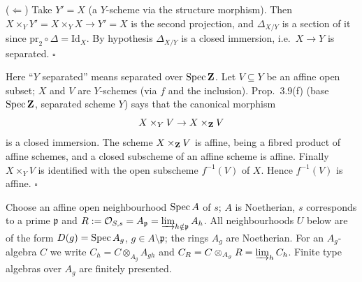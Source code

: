 \documentclass[11pt]{article}
\begin{document}
($\Leftarrow$) Take $Y'=X$ (a $Y$-scheme via the structure morphism). Then $X\times_YY'=X\times_YX\to Y'=X$ is the second projection, and $\Delta_{X/Y}$ is a section of it since $\mathrm{pr}_2\circ\Delta=\mathrm{Id}_X$. By hypothesis $\Delta_{X/Y}$ is a closed immersion, i.e.\ $X\to Y$ is separated. \hfill$\square$

\pf
Here ``$Y$ separated'' means separated over $\operatorname{Spec}\mathbf Z$. Let $V\subseteq Y$ be an affine open subset; $X$ and $V$ are $Y$-schemes (via $f$ and the inclusion). Prop.~3.9(f) (base $\operatorname{Spec}\mathbf Z$, separated scheme $Y$) says that the canonical morphism
\[ X\times_YV\to X\times_{\mathbf Z}V \]
is a closed immersion. The scheme $X\times_{\mathbf Z}V$ is affine, being a fibred product of affine schemes, and a closed subscheme of an affine scheme is affine. Finally $X\times_YV$ is identified with the open subscheme $f^{-1}(V)$ of $X$. Hence $f^{-1}(V)$ is affine. \hfill$\square$

\pf
Choose an affine open neighbourhood $\operatorname{Spec} A$ of $s$; $A$ is Noetherian, $s$ corresponds to a prime $\mathfrak p$ and $R:=\mathcal O_{S,s}=A_{\mathfrak p}=\varinjlim_{h\notin\mathfrak p}A_h$. All neighbourhoods $U$ below are of the form $D(g)=\operatorname{Spec} A_g$, $g\in A\setminus\mathfrak p$; the rings $A_g$ are Noetherian. For an $A_g$-algebra $C$ we write $C_h=C\otimes_{A_g}A_{gh}$ and $C_R=C\otimes_{A_g}R=\varinjlim_hC_h$. Finite type algebras over $A_g$ are finitely presented.
\end{document}
